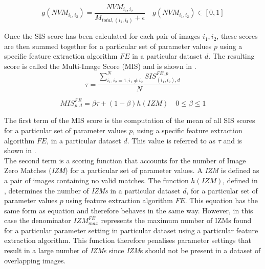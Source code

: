 \documentclass[11pt]{report}
\begin{document}
\begin{equation}
g(NVM_{i_1, i_2}) = \frac{NVM_{i_1, i_2}}{M_{total, (i_1, i_2)} + \epsilon} \quad g(NVM_{i_1, i_2}) \in [0, 1] %
\label{eqn:nvm}
\end{equation}

Once the SIS score has been calculated for each pair of images $i_1, i_2$, these scores are then summed together for a particular set of parameter values $p$ using a specific feature extraction algorithm $FE$ in a particular dataset $d$. The resulting score is called the Multi-Image Score (MIS) and is shown in .\\

\begin{equation}
\tau = \frac{\sum_{i_1, i_2=1 , i_1 \neq i_2}^{N} \textit{SIS}_{(i_1, i_2),d}^{FE,p}}{N}
\label{eqn:tau}
\end{equation}

\begin{equation}
MIS_{p, d}^{FE} = \beta \tau + (1-\beta) h(\textit{IZM}) \quad 0 \leq \beta \leq 1
\label{eqn:mims}
\end{equation}

The first term of the MIS score is the computation of the mean of all SIS scores for a particular set of parameter values $p$, using a specific feature extraction algorithm $FE$, in a particular dataset $d$. This value is referred to as $\tau$ and is shown in .\\

The second term is a scoring function that accounts for the number of Image Zero Matches (\textit{IZM}) for a particular set of parameter values. A \textit{IZM} is defined as a pair of images containing no valid matches. The function $h(IZM)$, defined in , determines the number of \textit{IZMs} in a particular dataset $d$, for a particular set of parameter values $p$ using feature extraction algorithm $FE$. This equation has the same form as equation  and therefore behaves in the same way. However, in this case the denominator $\textit{IZM}_{max}^{FE}$ represents the maximum number of IZMs found for a particular parameter setting in particular dataset using a particular feature extraction algorithm. This function therefore penalises parameter settings that result in a large number of \textit{IZM}s since \textit{IZM}s should not be present in a dataset of overlapping images. \\
\end{document}
